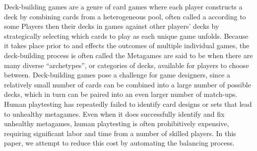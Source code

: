 
Deck-building games are a genre of card games where each player
constructs a deck by combining cards from a heterogeneous pool, often
called a  according to some  Players then  their decks in games against
other players' decks by strategically selecting which cards to play as
each unique game unfolds. Because it takes place prior to and effects
the outcomes of multiple individual games, the deck-building process
is often called the   Metagames are said to be
 when there are many diverse \enquote{archetypes}, or
categories of decks, available for players to choose between.
Deck-building games pose a challenge for game designers, since a
relatively small number of cards can be combined into a large number
of possible decks, which in turn can be paired into an even larger
number of match-ups. Human playtesting has repeatedly failed to
identify card designs or sets that lead to unhealthy metagames.
Even when it does successfully identify and fix unhealthy metagames,
human playtesting is often prohibitively expensive, requiring
significant labor and time from a number of skilled players. In this
paper, we attempt to reduce this cost by automating the balancing
process.
